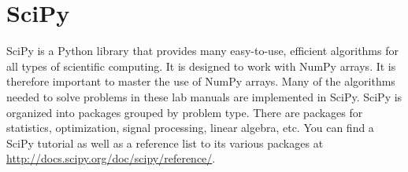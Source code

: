 \section*{SciPy}
SciPy is a Python library that provides many easy-to-use, efficient algorithms for all types of scientific computing.
It is designed to work with NumPy arrays.
It is therefore important to master the use of NumPy arrays.
Many of the algorithms needed to solve problems in these lab manuals are implemented in SciPy.
SciPy is organized into packages grouped by problem type.
There are packages for statistics, optimization, signal processing, linear algebra, etc.
You can find a SciPy tutorial as well as a reference list to its various packages at 
\url{http://docs.scipy.org/doc/scipy/reference/}. 

